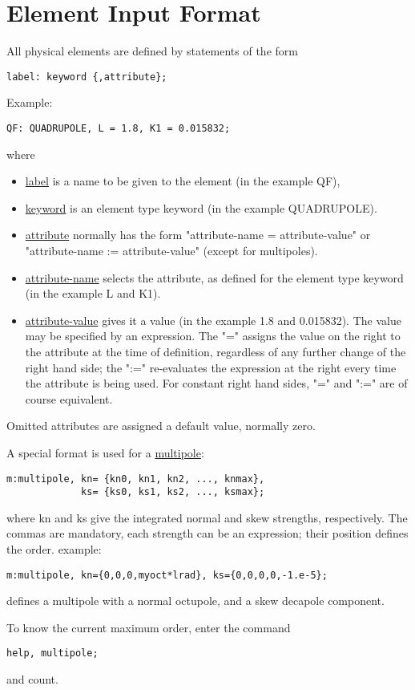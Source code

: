 
\section{Element Input Format}
All physical elements are defined by statements of the form 
\begin{verbatim}
label: keyword {,attribute};
\end{verbatim} 
Example: 
\begin{verbatim}
QF: QUADRUPOLE, L = 1.8, K1 = 0.015832;
\end{verbatim} 
where 
\begin{itemize}
	\item \href{label.html}{label} is a name to be given to the element (in the example QF), 
	\item \href{keyword.html}{keyword} is an element type keyword (in the example QUADRUPOLE). 
	\item \href{attribute.html}{attribute} normally has the form
          "attribute-name = attribute-value" or
          "attribute-name := attribute-value" (except for multipoles).  
	\item \href{label.html}{attribute-name} selects the attribute,
          as defined for the element type keyword (in the example L and
          K1).  
	\item \href{attribute.html}{attribute-value} gives it a value
          (in the example 1.8 and 0.015832). The value may be specified
          by an expression. The "=" assigns the value on the right to
          the attribute at the time of definition, regardless of any
          further change of the right hand side; the ":=" re-evaluates
          the expression at the right every time the attribute is being
          used. For constant right hand sides, "=" and ":=" are of
          course equivalent.  
\end{itemize} 

Omitted attributes are assigned a default value, normally zero. 

A special format is used for a \href{multipole.html}{multipole}: 
\begin{verbatim}
m:multipole, kn= {kn0, kn1, kn2, ..., knmax},
             ks= {ks0, ks1, ks2, ..., ksmax};
\end{verbatim} 
where kn and ks give the integrated normal and skew strengths,
respectively. The commas are mandatory, each strength can be an
expression; their position defines the order. example:  
\begin{verbatim}
m:multipole, kn={0,0,0,myoct*lrad}, ks={0,0,0,0,-1.e-5};
\end{verbatim} 
defines a multipole with a normal octupole, and a skew decapole component. 

To know the current maximum order, enter the command 
\begin{verbatim}
help, multipole;
\end{verbatim} 
and count. 

